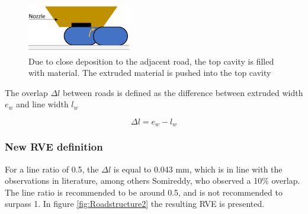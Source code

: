 \begin{figure}[H]
    \centering
    \includegraphics[width=0.40\textwidth]{chapter_4_RVE_Definition/figures/Roadformation.PNG}
    \caption{Due to close deposition to the adjacent road, the top cavity is filled with material. The extruded material is pushed into the top cavity}
    \label{fig:Roadformation}
\end{figure}

The overlap $\Delta l$ between roads is defined as the difference between extruded width $e_w$ and line width $l_w$

\begin{equation} \label{eqn:overlap}
\Delta l=e_w-l_w
\end{equation}




\subsubsection{New RVE definition}
For a line ratio of 0.5, the $\Delta l$ is equal to 0.043 mm, which is in line with the observations in literature, among others Somireddy, who observed a 10\% overlap. The line ratio is recommended to be around 0.5, and is not recommended to surpass 1.  In figure \ref{fig:Roadstructure2} the resulting RVE is presented.

